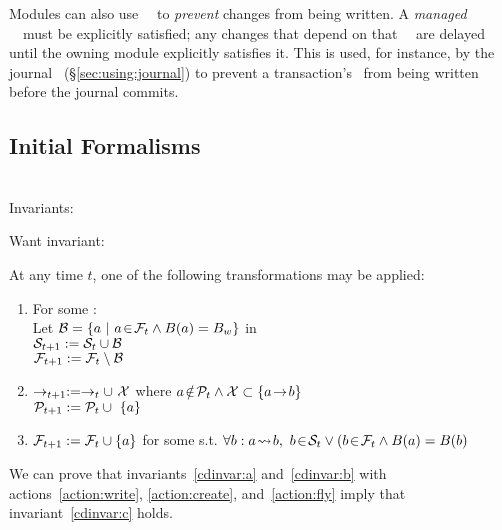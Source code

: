 Modules can also use \noop\ \chdescs\ to \emph{prevent} changes from being
written. A \emph{managed} \noop\ \chdesc\ must be explicitly satisfied; any
changes that depend on that \noop\ \chdesc\ are delayed until the owning module
explicitly satisfies it. This is used, for instance, by the journal \module\
(\S\ref{sec:using:journal}) to prevent a transaction's \chdescs\ from
being written before the journal commits.

\subsection{Initial Formalisms}

\noindent\\ Invariants:


\noindent Want invariant:
\cdinvar{c}{If \(\inset{a}{\psetsat{t}} \land \indirdepends{a}{b}\)
then \inset{b}{\psetsat{t}} }

\noindent At any time $t$, one of the following transformations may be applied:
\begin{enumerate}
\item For some :\\
Let \(\pset{B} = \{a\ |\ \inset{a}{\psetinflight{t}} \land \blockof{a} = \block{w} \}\) in\\
\(\mathcal{S}_{t+1} := \mathcal{S}_{t} \cup \mathcal{B}\)\\
\(\mathcal{F}_{t+1} := \mathcal{F}_{t} \setminus \mathcal{B}\)
\label{action:write}

\item \(\deps{t+1} := \deps{t} \cup\ \pset{X}\) where
\(a\! \notin\! \mathcal{P}_{t} \land \mathcal{X} \subset \{a\! \rightarrow\! b\}\)\\
\(\psetall{t+1} := \psetall{t} \cup\ \{a\}\)
\label{action:create}

\item \(\mathcal{F}_{t+1} := \mathcal{F}_{t} \cup \{a\}\) for some
\notinset{a}{\psetsat{t}} s.t. \(\forall b: a\! \leadsto\! b,\
b\! \in\! \mathcal{S}_{t} \lor (b\! \in\! \mathcal{F}_{t} \land
B(a) = B(b)\)
\label{action:fly}
\end{enumerate}

We can prove that invariants~\ref{cdinvar:a} and~\ref{cdinvar:b}
with actions~\ref{action:write}, \ref{action:create}, and~\ref{action:fly}
imply that invariant~\ref{cdinvar:c} holds.


